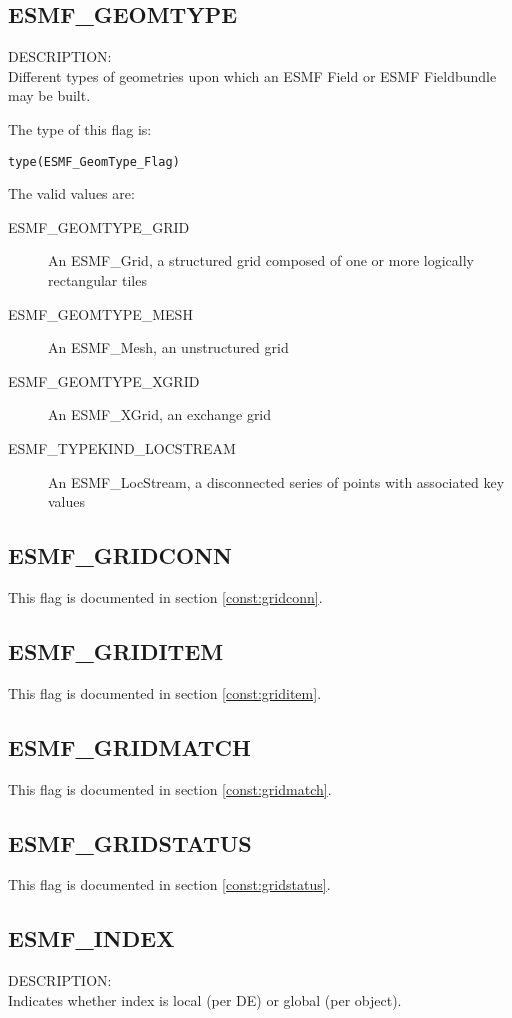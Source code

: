 \subsection{ESMF\_GEOMTYPE}
\label{const:geomtype}

{\sf DESCRIPTION:\\}
Different types of geometries upon which an ESMF Field or ESMF Fieldbundle may
be built. 

The type of this flag is:

{\tt type(ESMF\_GeomType\_Flag)}

The valid values are:
\begin{description}
\item [ESMF\_GEOMTYPE\_GRID]
      An ESMF\_Grid, a structured grid composed of one or more logically rectangular tiles
\item [ESMF\_GEOMTYPE\_MESH]
      An ESMF\_Mesh, an unstructured grid
\item [ESMF\_GEOMTYPE\_XGRID]
      An ESMF\_XGrid, an exchange grid
\item [ESMF\_TYPEKIND\_LOCSTREAM]
      An ESMF\_LocStream, a disconnected series of points with associated key values
\end{description}

\subsection{ESMF\_GRIDCONN}
This flag is documented in section \ref{const:gridconn}.

\subsection{ESMF\_GRIDITEM}
This flag is documented in section \ref{const:griditem}.

\subsection{ESMF\_GRIDMATCH}
This flag is documented in section \ref{const:gridmatch}.

\subsection{ESMF\_GRIDSTATUS}
This flag is documented in section \ref{const:gridstatus}.

\subsection{ESMF\_INDEX}
\label{const:indexflag}
{\sf DESCRIPTION:\\}
Indicates whether index is local (per DE) or global (per object).

